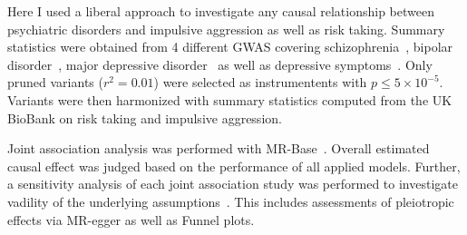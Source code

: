 Here I used a liberal approach to investigate any causal relationship between psychiatric disorders and impulsive aggression as well as risk taking.
Summary statistics were obtained from 4 different GWAS covering schizophrenia~\cite{Ripke2014}, bipolar disorder~\cite{PsychiatricGWASConsortiumBipolarDisorderWorkingGroup2011}, major depressive disorder~\cite{MajorDepressiveDisorderWorkingGroupofthePsychiatricGWASConsortium2013} as well as depressive symptoms~\cite{Okbay2016}.
Only pruned variants ($r^2=0.01$) were selected as instrumentents with $p\leq 5\times 10^{-5}$.
Variants were then harmonized with summary statistics computed from the UK BioBank on risk taking and impulsive aggression. 

Joint association analysis was performed with MR-Base~\cite{Hemani2016}.
Overall estimated causal effect was judged based on the performance of all applied models.
Further, a sensitivity analysis of each joint association study was performed to investigate vadility of the underlying assumptions~\cite{Burgess2016}.  
This includes assessments of pleiotropic effects via MR-egger as well as Funnel plots.
